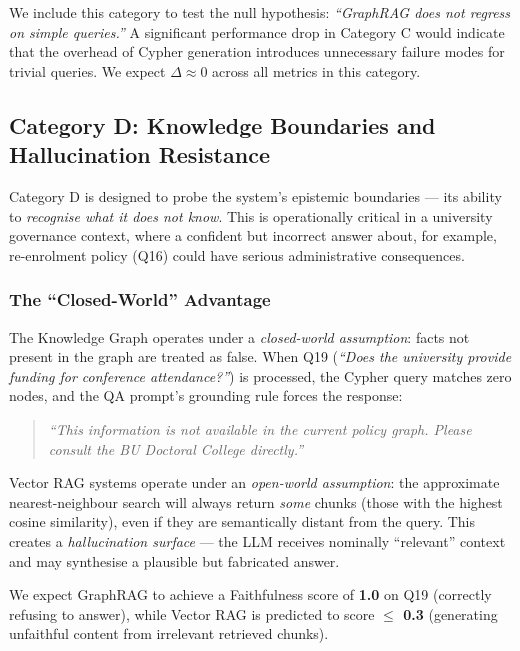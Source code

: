 We include this category to test the null hypothesis: \textit{``GraphRAG does not regress on simple queries.''} A significant performance drop in Category C would indicate that the overhead of Cypher generation introduces unnecessary failure modes for trivial queries. We expect $\Delta \approx 0$ across all metrics in this category.

\subsection{Category D: Knowledge Boundaries and Hallucination Resistance}

Category D is designed to probe the system's epistemic boundaries — its ability to \textit{recognise what it does not know}. This is operationally critical in a university governance context, where a confident but incorrect answer about, for example, re-enrolment policy (Q16) could have serious administrative consequences.

\subsubsection{The ``Closed-World'' Advantage}

The Knowledge Graph operates under a \textit{closed-world assumption}: facts not present in the graph are treated as false. When Q19 (\textit{``Does the university provide funding for conference attendance?''}) is processed, the Cypher query matches zero nodes, and the QA prompt's grounding rule forces the response:

\begin{quote}
    \textit{``This information is not available in the current policy graph. Please consult the BU Doctoral College directly.''}
\end{quote}

Vector RAG systems operate under an \textit{open-world assumption}: the approximate nearest-neighbour search will always return \textit{some} chunks (those with the highest cosine similarity), even if they are semantically distant from the query. This creates a \textit{hallucination surface} — the LLM receives nominally ``relevant'' context and may synthesise a plausible but fabricated answer.

We expect GraphRAG to achieve a Faithfulness score of \textbf{1.0} on Q19 (correctly refusing to answer), while Vector RAG is predicted to score \textbf{$\leq$ 0.3} (generating unfaithful content from irrelevant retrieved chunks).


